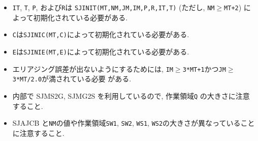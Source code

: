 \documentclass[a4j]{jarticle}
\begin{document}
\begin{enumerate}
  \begin{itemize}
  \item {\tt IT}, {\tt T}, {\tt P}, および{\tt R}は
  {\tt SJINIT(MT,NM,JM,IM,P,R,IT,T)} (ただし, {\tt NM}$\ge${\tt MT+2})
  によって初期化されている必要がある.
  \item {\tt C}は{\tt SJINIC(MT,C)}によって初期化されている必要がある.
  \item {\tt E}は{\tt SJINIE(MT,E)}によって初期化されている必要がある.  
  \item エリアジング誤差が出ないようにするためには,
  {\tt IM}$\ge${\tt 3*MT+1}かつ{\tt JM}$\ge${\tt 3*MT/2.0}が満されている必要
  がある.
  \item 内部で SJMS2G, SJMG2S を利用しているので, 作業領域{\tt Q}
  の大きさに注意すること.
  \item SJAJCB と{\tt NM}の値や作業領域{\tt SW1}, {\tt SW2}, {\tt WS1}, 
  {\tt WS2}の大きさが異なっていることに注意すること.
  \end{itemize}  

\end{enumerate}

\end{document}
